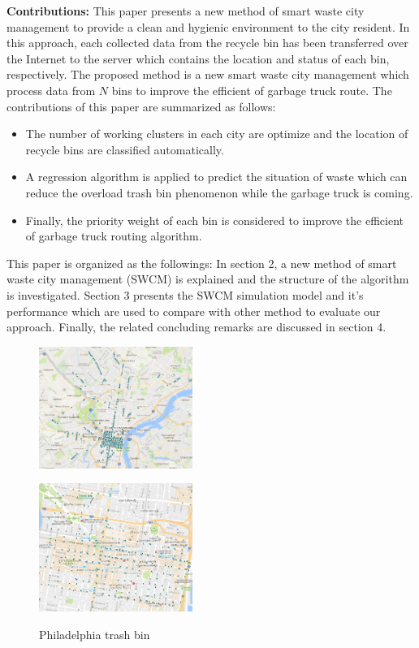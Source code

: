 \documentclass[conference,compsoc]{IEEEtran}
\begin{document}
\par\textbf{Contributions:} 
This paper presents a new method of smart waste city management to provide a clean and hygienic environment to the city resident.  In this approach, each collected data from the recycle bin has been transferred over the Internet to the server which contains the location and status of each bin, respectively. The proposed method is a new smart waste city management which process data from $N$ bins to improve the efficient of garbage truck route.  The contributions of this paper are summarized as follows:
\begin{itemize}
\item The number of working clusters in each city are optimize and the location of recycle bins are classified automatically. 

\item A regression algorithm is applied to predict the situation of waste which can  reduce the overload trash bin phenomenon while the garbage truck is coming.

\item Finally, the priority weight of each bin is considered to improve the efficient of garbage truck routing algorithm.

\end{itemize}
\par This paper is organized as the followings: In section 2,  a new method of smart waste city management (SWCM) is explained and the structure of the algorithm is investigated. Section 3 presents the SWCM simulation model and it's performance which are used to compare with other method to evaluate our approach.  Finally, the related concluding remarks are discussed in section 4.

\begin{figure}
	\centering
	\parbox{5cm}{
		\includegraphics[width=5cm]{overview1}
		\label{fig1a}}
	\qquad
	\begin{minipage}{5cm}
		\includegraphics[width=5cm]{overview3}
		\label{fig1b}
	\end{minipage}
\caption{Philadelphia trash bin}
\label{Philadelphia}
\end{figure}
 
\end{document}

